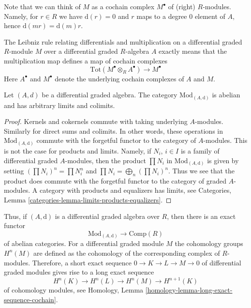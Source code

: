 \noindent
Note that we can think of $M$ as a cochain complex $M^\bullet$
of (right) $R$-modules. Namely, for $r \in R$ we have $\text{d}(r) = 0$
and $r$ maps to a degree $0$ element of $A$, hence
$\text{d}(mr) = \text{d}(m)r$.

\medskip\noindent
The Leibniz rule relating differentials and multiplication on a differential
graded $R$-module $M$ over a differential graded $R$-algebra $A$
exactly means that the multiplication map defines a map of cochain complexes
$$
\text{Tot}(M^\bullet \otimes_R A^\bullet) \to M^\bullet
$$
Here $A^\bullet$ and $M^\bullet$ denote the underlying cochain complexes
of $A$ and $M$.

\begin{lemma}
\label{lemma-dgm-abelian}
Let $(A, d)$ be a differential graded algebra. The category
$\text{Mod}_{(A, \text{d})}$ is abelian and has arbitrary limits and colimits.
\end{lemma}

\begin{proof}
Kernels and cokernels commute with taking underlying $A$-modules.
Similarly for direct sums and colimits. In other words, these operations
in $\text{Mod}_{(A, \text{d})}$ commute with the forgetful functor to the
category of $A$-modules. This is not the case for products and limits.
Namely, if $N_i$, $i \in I$ is a family of
differential graded $A$-modules, then the product $\prod N_i$ in
$\text{Mod}_{(A, \text{d})}$ is given by setting $(\prod N_i)^n = \prod N_i^n$
and $\prod N_i = \bigoplus_n (\prod N_i)^n$. Thus we see that the product
does commute with the forgetful functor to the category of graded $A$-modules.
A category with products and equalizers has limits, see
Categories, Lemma \ref{categories-lemma-limits-products-equalizers}.
\end{proof}

\noindent
Thus, if $(A, \text{d})$ is a differential graded
algebra over $R$, then there is an exact functor
$$
\text{Mod}_{(A, \text{d})} \longrightarrow \text{Comp}(R)
$$
of abelian categories. For a differential graded module $M$ the
cohomology groups $H^n(M)$ are defined as the cohomology of the
corresponding complex of $R$-modules. Therefore, a short exact
sequence $0 \to K \to L \to M \to 0$ of differential graded modules
gives rise to a long exact sequence
\begin{equation}
\label{equation-les}
H^n(K) \to H^n(L) \to H^n(M) \to H^{n + 1}(K)
\end{equation}
of cohomology modules, see
Homology, Lemma \ref{homology-lemma-long-exact-sequence-cochain}.

